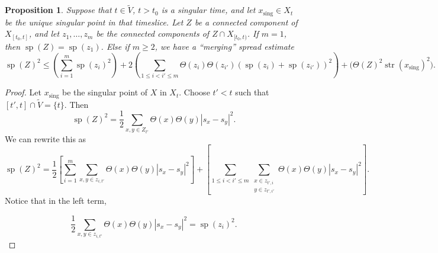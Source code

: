 \documentclass[11pt,reqno,twoside]{amsart}
\newcommand{\sing}{\mathrm{sing}}
\DeclareMathOperator{\spread}{\mathrm{sp}}
\DeclareMathOperator{\strength}{\mathrm{str}}
\newtheorem{proposition}[lemma]{Proposition}
\theoremstyle{definition}
\begin{document}
\begin{proposition} \label{merge-spread-estimate}
    Suppose that $t \in \tilde V$, $t > t_0$ is a singular time, and let $x_\sing \in X_t$ be the unique singular point in that timeslice. Let $Z$ be a connected component of $X_{[t_0,t]}$, and let $z_1,\ldots,z_m$ be the connected components of $Z \cap X_{[t_0,t)}$. If $m=1$, then $\spread(Z) = \spread(z_1)$. Else if $m \geq 2$, we have a ``merging'' spread estimate
    \[\spread(Z)^2 \leq \left( \sum_{i=1}^m \spread(z_i)^2 \right) + 2\left( \sum_{1 \leq i < i' \leq m} \Theta(z_i)\Theta(z_{i'})(\spread(z_i)+\spread(z_{i'}))^2 \right) + \bigg(\Theta(Z)^2 \strength(x_\sing)^2 \bigg).\]
\end{proposition}

\begin{proof} Let $x_\sing$ be the singular point of $X$ in $X_t$.
    Choose $t' < t$ such that $[t',t] \cap \tilde V = \{t\}.$ Then
    \[\spread(Z)^2 = \frac{1}{2}\sum_{x,y\in Z_{t'}} \Theta(x) \Theta(y) |s_x-s_y|^2.\]
    We can rewrite this as 
    \[\spread(Z)^2 = \frac{1}{2} \left[\sum_{i=1}^m \sum_{x,y \in z_{i,t'}} \Theta(x) \Theta(y) |s_x-s_y|^2 \right] + \left[ \sum_{1 \leq i < i' \leq m} \sum_{\substack{x \in z_{t',i} \\ y \in z_{t',i'}}} \Theta(x) \Theta(y) |s_x-s_y|^2\right].\]
    Notice that in the left term,

    \[\frac{1}{2} \sum_{x,y \in z_{i,t'}} \Theta(x)\Theta(y) |s_x-s_y|^2 = \spread(z_i)^2.\]


\end{proof}
\end{document}
